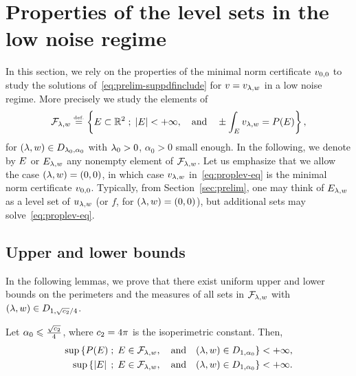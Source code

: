 
\section{Properties of the level sets in the low noise regime}\label{sec:proplev}

In this section, we rely on the properties of the minimal norm certificate $v_{0,0}$ to study the solutions of~\eqref{eq:prelim-suppdfinclude} for $v=v_{\lambda,w}$ in a low noise regime. More precisely we study the elements of
\begin{align}\label{eq:proplev-eq}
  \mathcal{F}_{\lambda,w}\stackrel{\mbox{\upshape\tiny def.}}{=}\left\{ E\subset \mathbb{R}^2 \;;\; \left| E \right|<+\infty, \quad \text{and} \quad  \pm\int_E v_{\lambda,w} = P(E) \right\},
\end{align}
for $(\lambda, w)\in D_{\lambda_0,\alpha_0}$ with $\lambda_0>0$, $\alpha_0>0$ small enough.
In the following, we denote by $E$ or $E_{\lambda,w}$ any nonempty element of $\mathcal{F}_{\lambda,w}$. Let us emphasize that we allow the case $(\lambda,w)=(0,0)$, in which case $v_{\lambda,w}$ in~\eqref{eq:proplev-eq} is the minimal norm certificate $v_{0,0}$. Typically, from Section~\ref{sec:prelim}, one may think of $E_{\lambda,w}$ as a level set of $u_{\lambda,w}$ (or $f$, for $(\lambda,w)=(0,0)$), but additional  sets may solve~\eqref{eq:proplev-eq}.

\subsection{Upper and lower bounds}
In the following lemmas, we prove that there exist uniform upper and lower bounds on the perimeters and the measures of all sets in $\mathcal{F}_{\lambda,w}$ with $(\lambda,w)\in D_{1,\sqrt{c_2}/4}$.

\begin{lem}\label{lem:unif_bd_lev_sets}
  Let $\alpha_0\leqslant \frac{\sqrt{c_2}}{4}$, where $c_2=4\pi$ is the isoperimetric constant. 
Then,
\begin{align}
  \label{eq:proplev-persup}  \sup \left\{ P(E) \;;\; E\in \mathcal{F}_{\lambda,w}, \quad \text{and} \quad (\lambda,w)\in D_{1,\alpha_0}  \right\}&<+\infty,\\
  \label{eq:proplev-areasup} \sup \left\{ \left| E \right| \;;\; E\in \mathcal{F}_{\lambda,w}, \quad \text{and} \quad (\lambda,w)\in D_{1,\alpha_0}  \right\}&<+\infty.
\end{align}
\end{lem}

